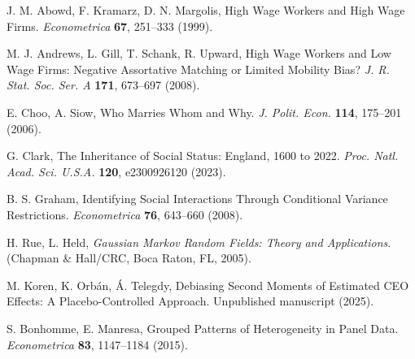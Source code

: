 \documentclass[9pt,twocolumn,twoside]{pnas-new}
\begin{document}
\begin{thebibliography}{9}

J. M. Abowd, F. Kramarz, D. N. Margolis, 
High Wage Workers and High Wage Firms. 
\textit{Econometrica} \textbf{67}, 251--333 (1999).

M. J. Andrews, L. Gill, T. Schank, R. Upward, 
High Wage Workers and Low Wage Firms: Negative Assortative Matching or Limited Mobility Bias? 
\textit{J. R. Stat. Soc. Ser. A} \textbf{171}, 673--697 (2008).

E. Choo, A. Siow, 
Who Marries Whom and Why. 
\textit{J. Polit. Econ.} \textbf{114}, 175--201 (2006).

G. Clark, 
The Inheritance of Social Status: England, 1600 to 2022. 
\textit{Proc. Natl. Acad. Sci. U.S.A.} \textbf{120}, e2300926120 (2023).

B. S. Graham, 
Identifying Social Interactions Through Conditional Variance Restrictions. 
\textit{Econometrica} \textbf{76}, 643--660 (2008).

H. Rue, L. Held, 
\textit{Gaussian Markov Random Fields: Theory and Applications}. 
(Chapman \& Hall/CRC, Boca Raton, FL, 2005).

M. Koren, K. Orbán, Á. Telegdy, 
Debiasing Second Moments of Estimated CEO Effects: A Placebo-Controlled Approach. 
Unpublished manuscript (2025).

S. Bonhomme, E. Manresa, 
Grouped Patterns of Heterogeneity in Panel Data. 
\textit{Econometrica} \textbf{83}, 1147--1184 (2015).

\end{thebibliography}
\end{document}
